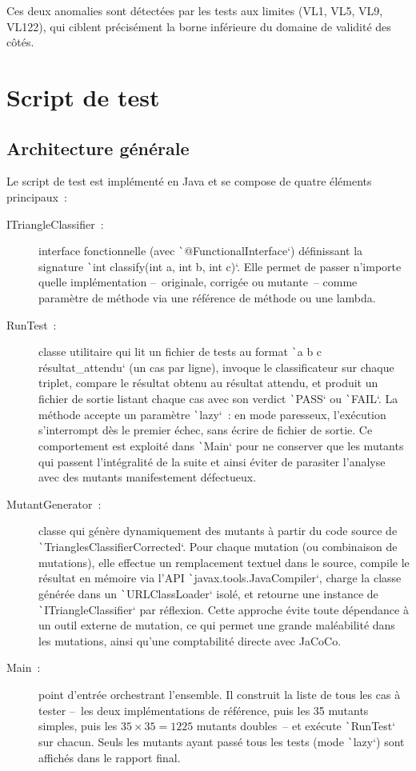 \documentclass[a4paper,11pt]{article}
\begin{document}
Ces deux anomalies sont détectées par les tests aux limites (VL1, VL5, VL9, VL122), qui ciblent précisément la borne inférieure du domaine de validité des côtés.

\section{Script de test}

\subsection{Architecture générale}

Le script de test est implémenté en Java et se compose de quatre éléments principaux~:

\begin{description}
    \item[ITriangleClassifier~:] interface fonctionnelle (avec \texttt`@FunctionalInterface`) définissant la signature \texttt`int classify(int a, int b, int c)`. Elle permet de passer n'importe quelle implémentation --~originale, corrigée ou mutante~-- comme paramètre de méthode via une référence de méthode ou une lambda.
    \item[RunTest~:] classe utilitaire qui lit un fichier de tests au format \texttt`a b c résultat_attendu` (un cas par ligne), invoque le classificateur sur chaque triplet, compare le résultat obtenu au résultat attendu, et produit un fichier de sortie listant chaque cas avec son verdict \texttt`PASS` ou \texttt`FAIL`. La méthode accepte un paramètre \texttt`lazy`~: en mode paresseux, l'exécution s'interrompt dès le premier échec, sans écrire de fichier de sortie. Ce comportement est exploité dans \texttt`Main` pour ne conserver que les mutants qui passent l'intégralité de la suite et ainsi éviter de parasiter l'analyse avec des mutants manifestement défectueux.
    \item[MutantGenerator~:] classe qui génère dynamiquement des mutants à partir du code source de \texttt`TrianglesClassifierCorrected`. Pour chaque mutation (ou combinaison de mutations), elle effectue un remplacement textuel dans le source, compile le résultat en mémoire via l'API \texttt`javax.tools.JavaCompiler`, charge la classe générée dans un \texttt`URLClassLoader` isolé, et re\-tourne une instance de \texttt`ITriangleClassifier` par réflexion. Cette approche évite toute dépend\-ance à un outil externe de mutation, ce qui permet une grande maléabilité dans les mutations, ainsi qu'une comptabilité directe avec JaCoCo.
    \item[Main~:] point d'entrée orchestrant l'ensemble. Il construit la liste de tous les cas à tester --~les deux implémentations de référence, puis les 35 mutants simples, puis les $35 \times 35 = 1225$ mutants doubles~-- et exécute \texttt`RunTest` sur chacun. Seuls les mutants ayant passé tous les tests (mode \texttt`lazy`) sont affichés dans le rapport final.
\end{description}
\end{document}
